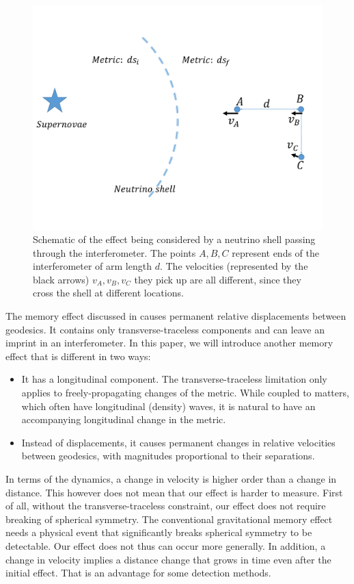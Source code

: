 \documentclass[aps,showpacs,twocolumn,floats,prd,superscriptaddress,nofootinbib]{revtex4-1}
\begin{document}
\begin{figure}[b]
\begin{center}
\includegraphics[scale = 0.27]{intro.pdf}
\caption{Schematic of the effect being considered by a neutrino shell passing through the interferometer. The points $A,B,C$ represent ends of the interferometer of arm length $d$. The velocities (represented by the black arrows) $v_A, v_B, v_C$ they pick up are all different, since they cross the shell at different locations.}
\label{fig:1}
\end{center}
\end{figure}

The memory effect discussed in \cite{Christodoulou_effect,GW_memory} causes permanent relative displacements between geodesics. It contains only transverse-traceless components and can leave an imprint in an interferometer. In this paper, we will introduce another memory effect that is different in two ways:
\begin{itemize}
\item It has a longitudinal component. The transverse-traceless limitation only applies to freely-propagating changes of the metric. While coupled to matters, which often have longitudinal (density) waves, it is natural to have an accompanying longitudinal change in the metric.
\item Instead of displacements, it causes permanent changes in relative velocities between geodesics, with magnitudes proportional to their separations.
\end{itemize}

In terms of the dynamics, a change in velocity is higher order than a change in distance. This however does not mean that our effect is harder to measure. First of all, without the transverse-traceless constraint, our effect does not require breaking of spherical symmetry. The conventional gravitational memory effect needs a physical event that significantly breaks spherical symmetry to be detectable. Our effect does not thus can occur more generally. In addition, a change in velocity implies a distance change that grows in time even after the initial effect. That is an advantage for some detection methods.  
\end{document}
